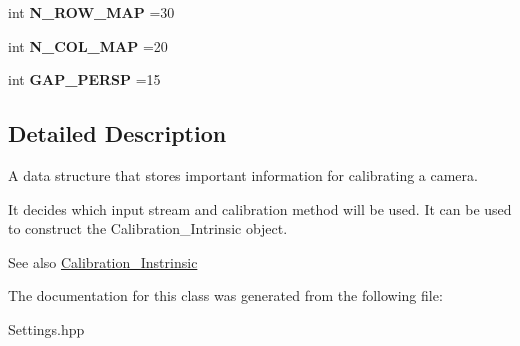 \begin{DoxyCompactItemize}
int {\bfseries N\+\_\+\+R\+O\+W\+\_\+\+M\+AP} =30
\item 
\mbox{\label{class_image_processing_1_1_settings_a98b824c588ec4a7abecba2106ae8278d}} 
int {\bfseries N\+\_\+\+C\+O\+L\+\_\+\+M\+AP} =20
\item 
\mbox{\label{class_image_processing_1_1_settings_abce4933b9d75aaeacc8c6f0faacd5b1f}} 
int {\bfseries G\+A\+P\+\_\+\+P\+E\+R\+SP} =15
\end{DoxyCompactItemize}


\subsection{Detailed Description}
A data structure that stores important information for calibrating a camera. 

It decides which input stream and calibration method will be used. It can be used to construct the Calibration\+\_\+\+Intrinsic object. \begin{DoxySeeAlso}{See also}
\mbox{\hyperlink{class_image_processing_1_1_calibration___instrinsic}{Calibration\+\_\+\+Instrinsic}} 
\end{DoxySeeAlso}


The documentation for this class was generated from the following file\+:\begin{DoxyCompactItemize}
\item 
Settings.\+hpp\end{DoxyCompactItemize}
